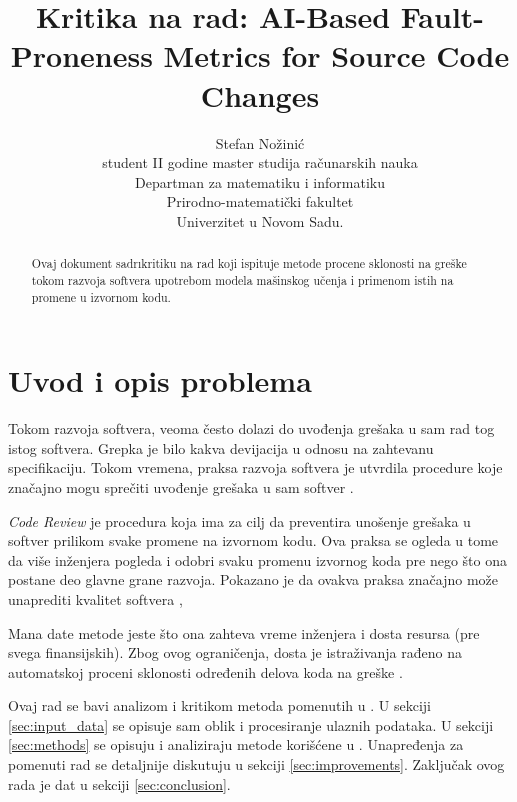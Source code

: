 \documentclass[twocolumns]{article}
\begin{document}
\title{Kritika na rad: AI-Based Fault-Proneness Metrics for Source Code Changes}
\author{Stefan Nožinić \\
student II godine master studija računarskih nauka \\
Departman za matematiku i informatiku \\
Prirodno-matematički fakultet \\
Univerzitet u Novom Sadu. \\
}

\begin{abstract}
    Ovaj dokument sadr\i kritiku na rad koji ispituje metode procene sklonosti na greške tokom razvoja softvera upotrebom modela mašinskog učenja i primenom istih na promene u izvornom kodu. 
\end{abstract}


\maketitle

\section{Uvod i opis problema}
\label{sec:introduction}

Tokom razvoja softvera, veoma često dolazi do uvođenja grešaka u sam rad tog istog softvera. Grepka je bilo kakva devijacija u odnosu na zahtevanu specifikaciju. Tokom vremena, praksa razvoja softvera je utvrdila procedure koje značajno mogu sprečiti uvođenje grešaka u sam softver \cite{kozlov2013fault}. 

\textit{Code Review} je procedura koja ima za cilj da preventira unošenje grešaka u softver prilikom svake promene na izvornom kodu. Ova praksa se ogleda u tome da više inženjera pogleda i odobri svaku promenu izvornog koda pre nego što ona postane deo glavne grane razvoja. Pokazano je da ovakva praksa značajno može unaprediti kvalitet softvera \cite{kozlov2013fault},

Mana date metode jeste što ona zahteva vreme inženjera i dosta resursa (pre svega finansijskih). Zbog ovog ograničenja, dosta je istraživanja rađeno na automatskoj proceni sklonosti određenih delova koda na greške \cite{altiero2023ai,fenton1999critique,gondra2008applying,ouellet2023combining}. 

Ovaj rad se bavi analizom i kritikom metoda pomenutih u \cite{altiero2023ai}. U sekciji \ref{sec:input_data} se opisuje sam oblik i procesiranje ulaznih podataka. U sekciji \ref{sec:methods} se opisuju i analiziraju metode korišćene u \cite{altiero2023ai}. Unapređenja za pomenuti rad se detaljnije diskutuju u sekciji \ref{sec:improvements}. Zaključak ovog rada je dat u sekciji \ref{sec:conclusion}.
\end{document}
